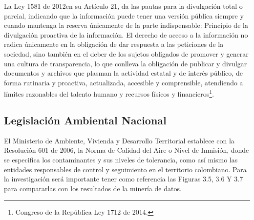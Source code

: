 \documentclass[a4paper,openright,12pt]{book}
\theoremstyle{definition}
\theoremstyle{remark}
\begin{document}
La Ley 1581 de 2012en su Artículo 21, da las pautas para la divulgación total o parcial, indicando que la información puede tener una versión pública siempre y cuando mantenga la reserva únicamente de la parte indispensable:
Principio de la divulgación proactiva de la información. El derecho de acceso a la información no radica únicamente en la obligación de dar respuesta a las peticiones de la sociedad, sino también en el deber de los sujetos obligados de promover y generar una cultura de transparencia, lo que conlleva la obligación de publicar y divulgar documentos y archivos que plasman la actividad estatal y de interés público, de forma rutinaria y proactiva, actualizada, accesible y comprensible, atendiendo a límites razonables del talento humano y recursos físicos y financieros\footnote{Congreso de la República Ley 1712 de 2014.}.
\subsection{Legislación Ambiental Nacional}
El Ministerio de Ambiente, Vivienda y Desarrollo Territorial establece con la Resolución 601 de 2006, la Norma de Calidad del Aire o Nivel de Inmisión, donde se especifica los contaminantes y sus niveles de tolerancia, como así mismo las entidades responsables de control y seguimiento en el territorio colombiano. Para la investigación será importante tener como referencia las Figuras 3.5, 3.6 Y 3.7 para compararlas con los resultados de la minería de datos.
\end{document}

